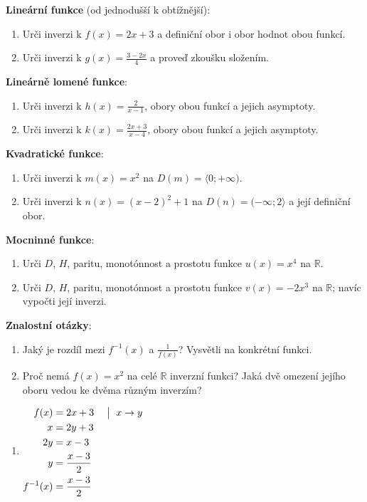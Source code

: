 \documentclass[11pt,a4paper]{article}
\begin{document}
\begin{zadaniReseniBox}[title={Domácí úkol}]
\textbf{Lineární funkce} (od jednodušší k obtížnější):
\begin{enumerate}[label=\alph*)]
\item Urči inverzi k $f(x)=2x+3$ a definiční obor i obor hodnot obou funkcí.
\item Urči inverzi k $g(x)=\frac{3-2x}{4}$ a proveď zkoušku složením.
\end{enumerate}
\textbf{Lineárně lomené funkce}:
\begin{enumerate}[label=\alph*),start=3]
\item Urči inverzi k $h(x)=\frac{2}{x-1}$, obory obou funkcí a jejich asymptoty.
\item Urči inverzi k $k(x)=\frac{2x+3}{x-4}$, obory obou funkcí a jejich asymptoty.
\end{enumerate}
\textbf{Kvadratické funkce}:
\begin{enumerate}[label=\alph*),start=5]
\item Urči inverzi k $m(x)=x^2$ na $D(m)=\langle0;+\infty)$.
\item Urči inverzi k $n(x)=(x-2)^2+1$ na $D(n)=(-\infty;2\rangle$ a její definiční obor.
\end{enumerate}
\textbf{Mocninné funkce}:
\begin{enumerate}[label=\alph*),start=7]
\item Urči $D$, $H$, paritu, monotónnost a prostotu funkce $u(x)=x^4$ na $\mathbb R$.
\item Urči $D$, $H$, paritu, monotónnost a prostotu funkce $v(x)=-2x^3$ na $\mathbb R$; navíc vypočti její inverzi.
\end{enumerate}
\textbf{Znalostní otázky}:
\begin{enumerate}[label=\alph*),start=9]
\item Jaký je rozdíl mezi $f^{-1}(x)$ a $\frac{1}{f(x)}$? Vysvětli na konkrétní funkci.
\item Proč nemá $f(x)=x^2$ na celé $\mathbb R$ inverzní funkci? Jaká dvě omezení jejího oboru vedou ke dvěma různým inverzím?
\end{enumerate}
\tcblower
\begin{enumerate}[label=\alph*)]
\item
\(\displaystyle\begin{aligned}f(x)&=2x+3 &&\bigm|\ x\to y\\x&=2y+3\\2y&=x-3\\y&=\frac{x-3}{2}\\f^{-1}(x)&=\frac{x-3}{2}\end{aligned}\)


\end{enumerate}
\end{zadaniReseniBox}
\end{document}
